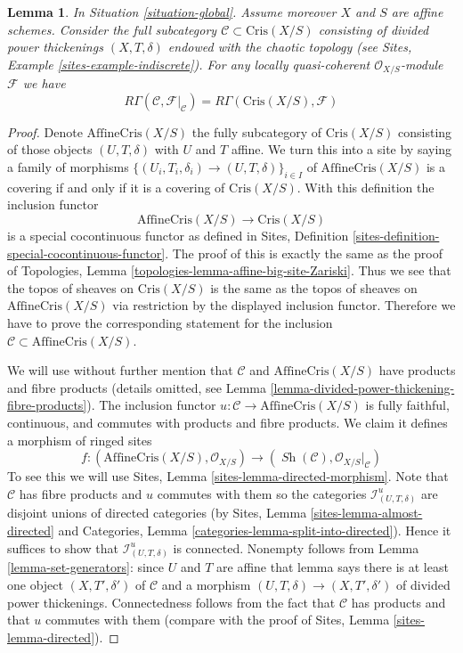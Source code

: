 \documentclass{stacks-project}
\theoremstyle{plain}
\newtheorem{lemma}[subsection]{Lemma}
\theoremstyle{definition}
\theoremstyle{remark}
\numberwithin{equation}{subsection}
\def\Sh{\mathop{\mathit{Sh}}\nolimits}
\begin{document}
\begin{lemma}
\label{lemma-compare}
In Situation \ref{situation-global}.
Assume moreover $X$ and $S$ are affine schemes.
Consider the full subcategory $\mathcal{C} \subset \text{Cris}(X/S)$
consisting of divided power thickenings $(X, T, \delta)$
endowed with the chaotic topology (see
Sites, Example \ref{sites-example-indiscrete}).
For any locally quasi-coherent $\mathcal{O}_{X/S}$-module $\mathcal{F}$
we have
$$
R\Gamma(\mathcal{C}, \mathcal{F}|_\mathcal{C}) =
R\Gamma(\text{Cris}(X/S), \mathcal{F})
$$
\end{lemma}

\begin{proof}
Denote $\text{AffineCris}(X/S)$ the fully subcategory of $\text{Cris}(X/S)$
consisting of those objects $(U, T, \delta)$ with $U$ and $T$ affine.
We turn this into a site by saying a family of morphisms
$\{(U_i, T_i, \delta_i) \to (U, T, \delta)\}_{i \in I}$ of
$\text{AffineCris}(X/S)$ is a covering if and only if it is a covering
of $\text{Cris}(X/S)$. With this definition the inclusion functor
$$
\text{AffineCris}(X/S) \longrightarrow \text{Cris}(X/S)
$$
is a special cocontinuous functor as defined in
Sites, Definition \ref{sites-definition-special-cocontinuous-functor}.
The proof of this is exactly the same as the proof of
Topologies, Lemma \ref{topologies-lemma-affine-big-site-Zariski}.
Thus we see that the topos of sheaves on $\text{Cris}(X/S)$
is the same as the topos of sheaves on $\text{AffineCris}(X/S)$
via restriction by the displayed inclusion functor.
Therefore we have to prove the corresponding statement for the
inclusion $\mathcal{C} \subset \text{AffineCris}(X/S)$.

\medskip\noindent
We will use without further mention that $\mathcal{C}$ and
$\text{AffineCris}(X/S)$ have products and fibre products
(details omitted, see
Lemma \ref{lemma-divided-power-thickening-fibre-products}).
The inclusion functor $u : \mathcal{C} \to \text{AffineCris}(X/S)$
is fully faithful, continuous, and commutes with products and fibre products.
We claim it defines a morphism of ringed sites
$$
f :
(\text{AffineCris}(X/S), \mathcal{O}_{X/S})
\longrightarrow
(\Sh(\mathcal{C}), \mathcal{O}_{X/S}|_\mathcal{C})
$$
To see this we will use Sites, Lemma \ref{sites-lemma-directed-morphism}.
Note that $\mathcal{C}$ has fibre products and $u$ commutes with them
so the categories $\mathcal{I}^u_{(U, T, \delta)}$ are disjoint unions
of directed categories (by Sites, Lemma \ref{sites-lemma-almost-directed} and
Categories, Lemma \ref{categories-lemma-split-into-directed}). Hence it
suffices to show that $\mathcal{I}^u_{(U, T, \delta)}$ is connected.
Nonempty follows from Lemma \ref{lemma-set-generators}: since $U$ and $T$
are affine that lemma says there is at least one object
$(X, T', \delta')$ of $\mathcal{C}$ and a morphism
$(U, T, \delta) \to (X, T', \delta')$ of divided power thickenings.
Connectedness follows from the fact that $\mathcal{C}$ has products
and that $u$ commutes with them (compare with the proof of
Sites, Lemma \ref{sites-lemma-directed}).


\end{proof}
\end{document}
